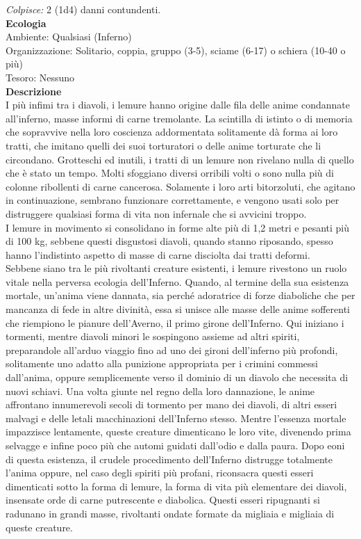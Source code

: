 \begin{multicols}{2}
\emph{Colpisce:} 2 (1d4) danni contundenti.\\
\textbf{Ecologia}\\
Ambiente: Qualsiasi (Inferno)\\
Organizzazione: Solitario, coppia, gruppo (3-5), sciame (6-17) o schiera (10-40 o più)\\
Tesoro: Nessuno\\
\textbf{Descrizione}\\
I più infimi tra i diavoli, i lemure hanno origine dalle fila delle anime condannate all'inferno, masse informi di carne tremolante. La scintilla di istinto o di memoria che sopravvive nella loro coscienza addormentata solitamente dà forma ai loro tratti, che imitano quelli dei suoi torturatori o delle anime torturate che li circondano. Grotteschi ed inutili, i tratti di un lemure non rivelano nulla di quello che è stato un tempo. Molti sfoggiano diversi orribili volti o sono nulla più di colonne ribollenti di carne cancerosa. Solamente i loro arti bitorzoluti, che agitano in continuazione, sembrano funzionare correttamente, e vengono usati solo per distruggere qualsiasi forma di vita non infernale che si avvicini troppo.\\
I lemure in movimento si consolidano in forme alte più di 1,2 metri e pesanti più di 100 kg, sebbene questi disgustosi diavoli, quando stanno riposando, spesso hanno l'indistinto aspetto di masse di carne disciolta dai tratti deformi.\\

Sebbene siano tra le più rivoltanti creature esistenti, i lemure rivestono un ruolo vitale nella perversa ecologia dell'Inferno. Quando, al termine della sua esistenza mortale, un’anima viene dannata, sia perché adoratrice di forze diaboliche che per mancanza di fede in altre divinità, essa si unisce alle masse delle anime sofferenti che riempiono le pianure dell'Averno, il primo girone dell'Inferno. Qui iniziano i tormenti, mentre diavoli minori le sospingono assieme ad altri spiriti, preparandole all'arduo viaggio fino ad uno dei gironi dell'inferno più profondi, solitamente uno adatto alla punizione appropriata per i crimini commessi dall'anima, oppure semplicemente verso il dominio di un diavolo che necessita di nuovi schiavi. Una volta giunte nel regno della loro dannazione, le anime affrontano innumerevoli secoli di tormento per mano dei diavoli, di altri esseri malvagi e delle letali macchinazioni dell'Inferno stesso. Mentre l'essenza mortale impazzisce lentamente, queste creature dimenticano le loro vite, divenendo prima selvagge e infine poco più che automi guidati dall'odio e dalla paura. Dopo eoni di questa esistenza, il crudele procedimento dell'Inferno distrugge totalmente l'anima oppure, nel caso degli spiriti più profani, riconsacra questi esseri dimenticati sotto la forma di lemure, la forma di vita più elementare dei diavoli, insensate orde di carne putrescente e diabolica. Questi esseri ripugnanti si radunano in grandi masse, rivoltanti ondate formate da migliaia e migliaia di queste creature.\\


\end{multicols}
